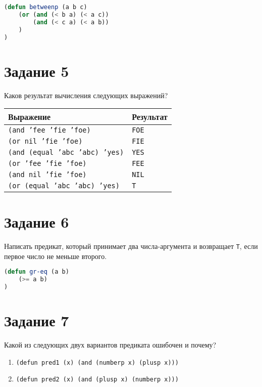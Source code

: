 \begin{lstlisting}[language=Lisp]
(defun betweenp (a b c)
	(or (and (< b a) (< a c))
		(and (< c a) (< a b))
	)
)
\end{lstlisting}

\section{Задание 5}

Каков результат вычисления следующих выражений?

\begin{table}
	\centering
	\begin{tabular}{|l|l|}
		\hline
		\textbf{Выражение} & \textbf{Результат} \\
		\hline
		\texttt{(and 'fee 'fie 'foe)} & \texttt{FOE} \\
		\hline
		\texttt{(or nil 'fie 'foe)} & \texttt{FIE} \\
		\hline
		\texttt{(and (equal 'abc 'abc) 'yes)} & \texttt{YES} \\
		\hline
		\texttt{(or 'fee 'fie 'foe)} & \texttt{FEE} \\
		\hline
		\texttt{(and nil 'fie 'foe)} & \texttt{NIL} \\
		\hline
		\texttt{(or (equal 'abc 'abc) 'yes)} & \texttt{T} \\
		\hline
	\end{tabular}
\end{table}

\section{Задание 6}

Написать предикат, который принимает два числа-аргумента и возвращает
\texttt{T}, если первое число не меньше второго.

\begin{lstlisting}[language=Lisp]
(defun gr-eq (a b)
	(>= a b)
)
\end{lstlisting}

\section{Задание 7}

Какой из следующих двух вариантов предиката ошибочен и почему?

\begin{enumerate}
	\item \texttt{(defun pred1 (x) (and (numberp x) (plusp x)))}
	\item \texttt{(defun pred2 (x) (and (plusp x) (numberp x)))}
\end{enumerate}

